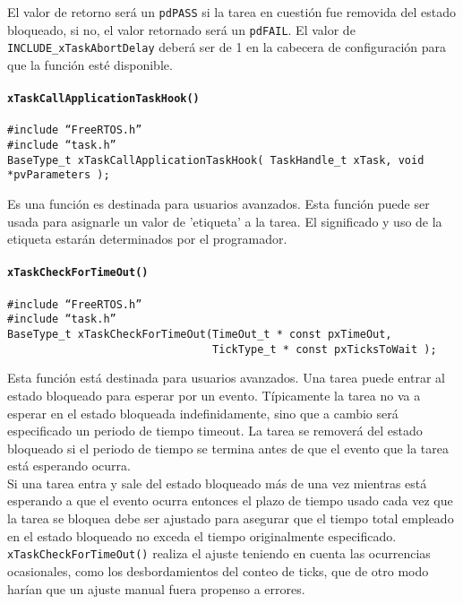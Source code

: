 El valor de retorno será un \texttt{pdPASS} si la tarea en cuestión fue removida del estado bloqueado, si no, el valor retornado será un \texttt{pdFAIL}. El valor de \texttt{INCLUDE\_xTaskAbortDelay} deberá ser de 1 en la cabecera de configuración para que la función esté disponible.

\paragraph{\texttt{xTaskCallApplicationTaskHook()}}

\begin{verbatim}
#include “FreeRTOS.h”
#include “task.h”
BaseType_t xTaskCallApplicationTaskHook( TaskHandle_t xTask, void *pvParameters );
\end{verbatim}

Es una función es destinada para usuarios avanzados. Esta función puede ser usada para asignarle un valor de 'etiqueta' a la tarea. El significado y uso de la etiqueta estarán determinados por el programador.


\paragraph{\texttt{xTaskCheckForTimeOut()}}

\begin{verbatim}
#include “FreeRTOS.h”
#include “task.h”
BaseType_t xTaskCheckForTimeOut(TimeOut_t * const pxTimeOut,
                                TickType_t * const pxTicksToWait );
\end{verbatim}

Esta función está destinada para usuarios avanzados. Una tarea puede entrar al estado bloqueado para esperar por un evento. Típicamente la tarea no va a esperar en el estado bloqueada indefinidamente, sino que a cambio será especificado un periodo de tiempo timeout. La tarea se removerá del estado bloqueado si el periodo de tiempo se termina antes de que el evento que la tarea está esperando ocurra.\\

Si una tarea entra y sale del estado bloqueado más de una vez mientras está esperando a que el evento ocurra entonces el plazo de tiempo usado cada vez que la tarea se bloquea debe ser ajustado para asegurar que el tiempo total empleado en el estado bloqueado no exceda el tiempo originalmente especificado. \texttt{xTaskCheckForTimeOut()} realiza el ajuste teniendo en cuenta las ocurrencias ocasionales, como los desbordamientos del conteo de ticks, que de otro modo harían que un ajuste manual fuera propenso a errores.\\

